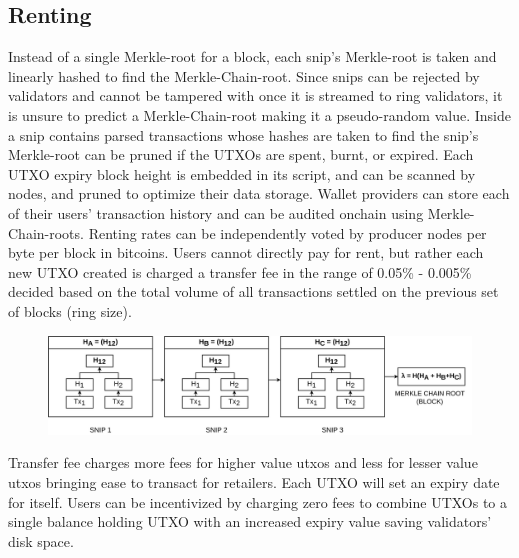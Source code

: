 \documentclass[a4paper,	10pt]{extarticle}
\begin{document}
\subsection{Renting}
Instead of a single Merkle-root for a block, each snip's Merkle-root is taken and linearly hashed to find the Merkle-Chain-root. Since snips can be rejected by validators and cannot be tampered with once it is streamed to ring validators, it is unsure to predict a Merkle-Chain-root making it a pseudo-random value. Inside a snip contains parsed transactions whose hashes are taken to find the snip's Merkle-root can be pruned if the UTXOs are spent, burnt, or expired. Each UTXO expiry block height is embedded in its script, and can be scanned by nodes, and pruned to optimize their data storage. Wallet providers can store each of their users' transaction history and can be audited onchain using Merkle-Chain-roots. Renting rates can be independently voted by producer nodes per byte per block in bitcoins. Users cannot directly pay for rent, but rather each new UTXO created is charged a transfer fee in the range of 0.05\% - 0.005\% decided based on the total volume of all transactions settled on the previous set of blocks (ring size).
\begin{figure}[H]
\begin{center}
\includegraphics[width=13cm]{merklechain}
\end{center}
\end{figure}
 Transfer fee charges more fees for higher value utxos and less for lesser value utxos bringing ease to transact for retailers. Each UTXO will set an expiry date for itself. Users can be incentivized by charging zero fees to combine UTXOs to a single balance holding UTXO with an increased expiry value saving validators' disk space. 
\end{document}
